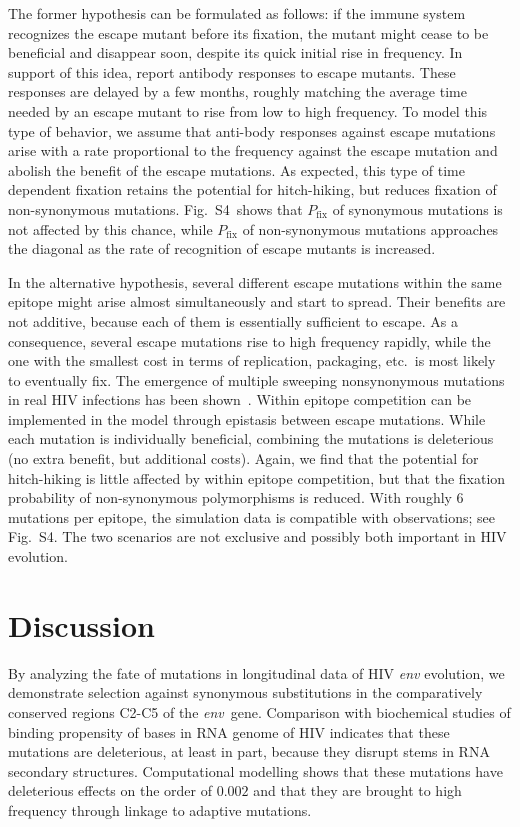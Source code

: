 \documentclass[rmp, twocolumn]{revtex4}
\newcommand{\pfix}{P_{\mathrm{fix}}}
\newcommand{\env}{\textit{env}}
\newcommand{\timedependence}{4}
\newcommand{\withinepi}{4}
\begin{document}
The former hypothesis can be formulated as follows: if the immune system
recognizes the escape mutant before its fixation, the mutant might cease to be
beneficial and disappear soon, despite its quick initial rise in frequency. In support of this idea,
\citet{richman_rapid_2003, bunnik_autologous_2008} report antibody responses to
escape mutants. These responses are delayed by a few months, roughly matching the
average time needed by an escape mutant to rise from low to high frequency.
To model this type of behavior, we assume that anti-body
responses against escape mutations arise with a rate proportional to the
frequency against the escape mutation and abolish the benefit of the escape
mutations. As expected, this type of time dependent
fixation retains the potential for hitch-hiking, but reduces fixation of
non-synonymous mutations. Fig.~S\timedependence~shows that $\pfix$ of
synonymous mutations is not affected by this chance, while $\pfix$ of non-synonymous
mutations approaches the diagonal as the rate of recognition of escape mutants
is increased. 

In the alternative hypothesis, several different escape
mutations within the same epitope might arise almost simultaneously and start to
spread. Their benefits are not additive, because each of them is
essentially sufficient to escape. As a consequence, several escape mutations rise to
high frequency rapidly, while the one with the smallest cost in terms of replication,
packaging, etc.~is most likely to eventually fix. The emergence of
multiple sweeping nonsynonymous mutations in real HIV infections has been 
shown~\citep{moore_limited_2009, bar_early_2012}.
Within epitope competition can be implemented in the model through epistasis
between escape mutations. While each mutation is individually beneficial,
combining the mutations is deleterious (no extra benefit, but additional costs).
Again, we find that the potential for hitch-hiking is little affected by within
epitope competition, but that the fixation probability of non-synonymous
polymorphisms is reduced. With roughly 6 mutations per epitope, the simulation
data is compatible with observations; see Fig.~S\withinepi.
The two scenarios are not exclusive and possibly both important in HIV
evolution.

\section{Discussion}
By analyzing the fate of mutations in longitudinal data of HIV \env{} evolution,
we demonstrate selection against synonymous substitutions in the comparatively
conserved regions C2-C5 of the \env~gene. Comparison with biochemical studies of binding propensity of bases in RNA
genome of HIV indicates that these mutations are deleterious, at least in part,
because they disrupt stems in RNA secondary structures. Computational modelling
shows that these mutations have deleterious effects on the order of $0.002$
and that they are brought to high frequency through linkage to adaptive
mutations.
\end{document}

